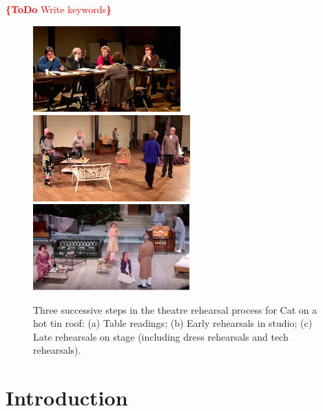 \documentclass[conference]{IEEEtran}
\newcommand{\todo}[1]{\noindent\textcolor{red}{{\bf \{ToDo} #1{\bf \}}}}
\begin{document}

\begin{keywords}
\todo{Write keywords}
\end{keywords}

%
\IEEEpeerreviewmaketitle


\begin{figure}[tp]
\centering
\includegraphics[height=3.3cm]{table_rehearsals}
\includegraphics[height=3.3cm]{studio_rehearsals}
\includegraphics[height=3.3cm]{stage_rehearsals}
\caption{Three successive steps in the theatre rehearsal process for Cat on a hot tin roof: (a) Table readings; (b) Early rehearsals in studio; (c) Late rehearsals on stage (including dress rehearsals and tech rehearsals).}
\label{fig_rehearsals}
\end{figure}


\section{Introduction}
\label{sec:intro}
\end{document}
